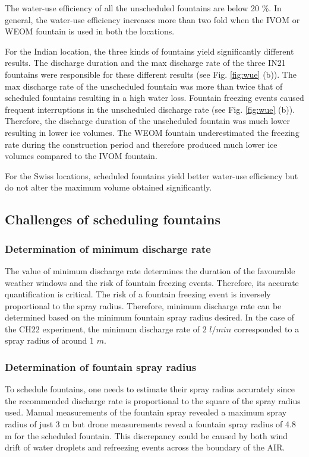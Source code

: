 \documentclass[tc, manuscript]{copernicus}
\begin{document}
The water-use efficiency of all the unscheduled fountains are below 20 \%. In general, the water-use efficiency
increases more than two fold when the IVOM or WEOM fountain is used in both the locations.  

For the Indian location, the three kinds of fountains yield significantly different results.  The discharge
duration and the max discharge rate of the three IN21 fountains were responsible for these different results
(see Fig. \ref{fig:wue} (b)). The max discharge rate of the unscheduled fountain was more than twice that of
scheduled fountains resulting in a high water loss.  Fountain freezing events caused frequent interruptions in
the unscheduled discharge rate (see Fig. \ref{fig:wue} (b)). Therefore, the discharge duration of the
unscheduled fountain was much lower resulting in lower ice volumes. The WEOM fountain underestimated the
freezing rate during the construction period and therefore produced much lower ice volumes compared to the IVOM
fountain.

For the Swiss locations, scheduled fountains yield better water-use efficiency but do not alter the maximum
volume obtained significantly. 

\subsection{Challenges of scheduling fountains}

\subsubsection{Determination of minimum discharge rate}

The value of minimum discharge rate determines the duration of the favourable weather windows and the risk of
fountain freezing events. Therefore, its accurate quantification is critical. The risk of a fountain freezing
event is inversely proportional to the spray radius. Therefore, minimum discharge rate can be determined based
on the minimum fountain spray radius desired. In the case of the CH22 experiment, the minimum discharge rate of
2 $l/min$ corresponded to a spray radius of around 1 $m$.

\subsubsection{Determination of fountain spray radius}

To schedule fountains, one needs to estimate their spray radius accurately since the recommended discharge rate
is proportional to the square of the spray radius used.  Manual measurements of the fountain spray revealed a
maximum spray radius of just 3 m but drone measurements reveal a fountain spray radius of 4.8 m for the
scheduled fountain. This discrepancy could be caused by both wind drift of water droplets and refreezing events
across the boundary of the AIR. 
\end{document}
